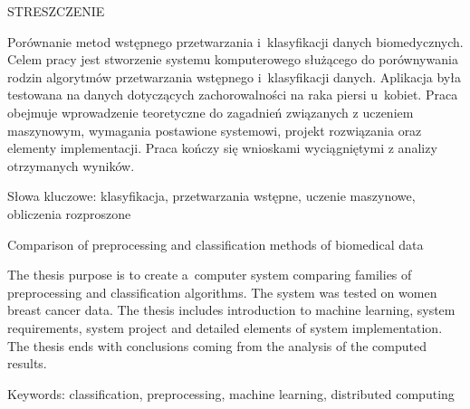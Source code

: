 \documentclass[../thesis.tex]{subfiles}
\begin{document}
\begin{center}
\fontsize{14pt}{18pt}\selectfont
STRESZCZENIE
\end{center}

\begin{flushleft}
Porównanie metod wstępnego przetwarzania i~klasyfikacji danych biomedycznych. Celem pracy jest stworzenie systemu komputerowego służącego do porównywania rodzin algorytmów przetwarzania wstępnego i~klasyfikacji danych. Aplikacja była testowana na danych dotyczących zachorowalności na raka piersi u~kobiet. Praca obejmuje wprowadzenie teoretyczne do zagadnień związanych z uczeniem maszynowym, wymagania postawione systemowi, projekt rozwiązania oraz elementy implementacji. Praca kończy się wnioskami wyciągniętymi z analizy otrzymanych wyników.

\vspace{7.5cm}

Słowa kluczowe: klasyfikacja, przetwarzania wstępne, uczenie maszynowe, obliczenia rozproszone
\end{flushleft}

\noindent\makebox[\linewidth]{\rule{\linewidth}{0.4pt}}

\begin{center}
\fontsize{14pt}{18pt}\selectfont
Comparison of preprocessing and classification methods of biomedical data
\end{center}

\begin{flushleft}
The thesis purpose is to create a~computer system comparing families of preprocessing and classification algorithms. The system was tested on women breast cancer data. The thesis includes introduction to machine learning, system requirements, system project and detailed elements of system implementation. The thesis ends with conclusions coming from the analysis of the computed results.

\vspace{7.5cm}

Keywords: classification, preprocessing, machine learning, distributed computing
\end{flushleft}

\thispagestyle{empty}
\cleardoublepage 
\end{document}
